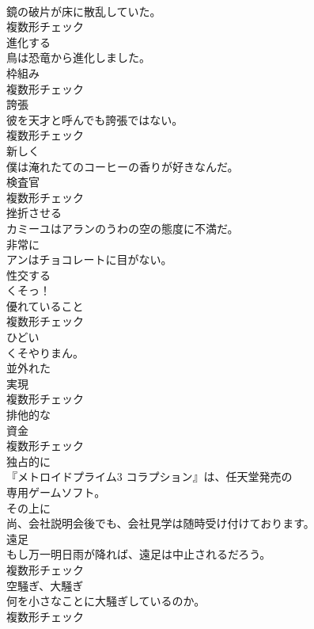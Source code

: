 \documentclass[8pt]{extreport}
\begin{document}
\begin{CJK}{UTF8}{min}
\\	鏡の破片が床に散乱していた。	
\\	複数形チェック
\\	[動詞]	進化する	
\\	鳥は恐竜から進化しました。	
\\	[名詞]	枠組み	
\\	複数形チェック
\\	[名詞]	誇張	
\\	彼を天才と呼んでも誇張ではない。	
\\	複数形チェック
\\	[副詞]	新しく	
\\	僕は淹れたてのコーヒーの香りが好きなんだ。	
\\	[名詞]	検査官	
\\	複数形チェック
\\	[動詞]	挫折させる	
\\	カミーユはアランのうわの空の態度に不満だ。	
\\	[副詞]	非常に	
\\	アンはチョコレートに目がない。	
\\	[動詞]	性交する	
\\	くそっ！	
\\	[名詞]	優れていること	
\\	複数形チェック
\\	[形容詞]	ひどい	
\\	くそやりまん。	
\\	[形容詞]	並外れた	
\\	[名詞]	実現	
\\	複数形チェック
\\	[形容詞]	排他的な	
\\	[名詞]	資金	
\\	複数形チェック
\\	[副詞]	独占的に	
\\	『メトロイドプライム3 コラプション』は、任天堂発売の
\\	専用ゲームソフト。	
\\	[副詞]	その上に	
\\	尚、会社説明会後でも、会社見学は随時受け付けております。	
\\	[名詞]	遠足	
\\	もし万一明日雨が降れば、遠足は中止されるだろう。	
\\	複数形チェック
\\	[名詞]	空騒ぎ、大騒ぎ	
\\	何を小さなことに大騒ぎしているのか。	
\\	複数形チェック

\end{CJK}
\end{document}
